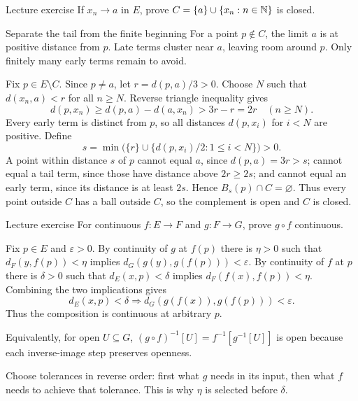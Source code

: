 \begin{exam}{Lecture exercise}
If $x_n\to a$ in $E$, prove $C=\{a\}\cup\{x_n:n\in\mathbb N\}$ is closed.
\end{exam}
\begin{method}{Separate the tail from the finite beginning}
For a point $p\notin C$, the limit $a$ is at positive distance from $p$. Late terms cluster near $a$, leaving room around $p$. Only finitely many early terms remain to avoid.
\end{method}
\begin{answer}
Fix $p\in E\setminus C$. Since $p\ne a$, let $r=d(p,a)/3>0$. Choose $N$ such that $d(x_n,a)<r$ for all $n\ge N$. Reverse triangle inequality gives
\[d(p,x_n)\ge d(p,a)-d(a,x_n)>3r-r=2r\quad(n\ge N).\]
Every early term is distinct from $p$, so all distances $d(p,x_i)$ for $i<N$ are positive. Define
\[s=\min\bigl(\{r\}\cup\{d(p,x_i)/2:1\le i<N\}\bigr)>0.\]
A point within distance $s$ of $p$ cannot equal $a$, since $d(p,a)=3r>s$; cannot equal a tail term, since those have distance above $2r\ge2s$; and cannot equal an early term, since its distance is at least $2s$. Hence $B_s(p)\cap C=\varnothing$. Thus every point outside $C$ has a ball outside $C$, so the complement is open and $C$ is closed.
\end{answer}
\begin{exam}{Lecture exercise}
For continuous $f:E\to F$ and $g:F\to G$, prove $g\circ f$ continuous.
\end{exam}
\begin{answer}
Fix $p\in E$ and $\varepsilon>0$. By continuity of $g$ at $f(p)$ there is $\eta>0$ such that $d_F(y,f(p))<\eta$ implies $d_G(g(y),g(f(p)))<\varepsilon$. By continuity of $f$ at $p$ there is $\delta>0$ such that $d_E(x,p)<\delta$ implies $d_F(f(x),f(p))<\eta$. Combining the two implications gives
\[d_E(x,p)<\delta\Rightarrow d_G(g(f(x)),g(f(p)))<\varepsilon.\]
Thus the composition is continuous at arbitrary $p$.

Equivalently, for open $U\subseteq G$, $(g\circ f)^{-1}[U]=f^{-1}[g^{-1}[U]]$ is open because each inverse-image step preserves openness.
\end{answer}
\begin{tip}
Choose tolerances in reverse order: first what $g$ needs in its input, then what $f$ needs to achieve that tolerance. This is why $\eta$ is selected before $\delta$.
\end{tip}
